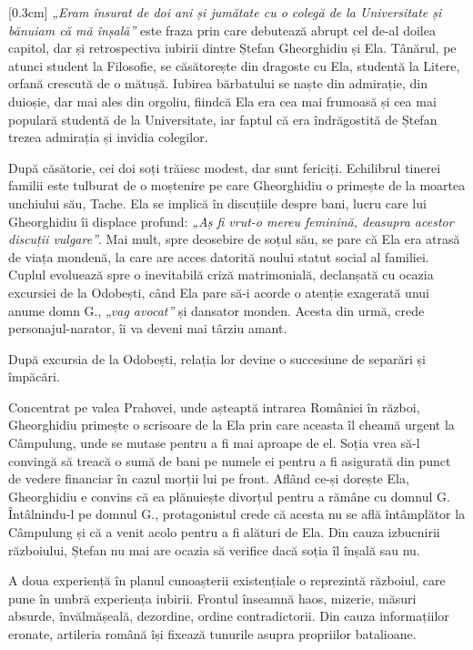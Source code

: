 [0.3cm]
\textit{„Eram însurat de doi ani și jumătate cu o colegă de la Universitate și bănuiam că mă înșală”} este fraza prin care debutează abrupt cel de-al doilea capitol, dar și retrospectiva iubirii dintre Ștefan Gheorghidiu și Ela. Tânărul, pe atunci student la Filosofie, se căsătorește din dragoste cu Ela, studentă la Litere, orfană crescută de o mătușă. Iubirea bărbatului se naște din admirație, din duioșie, dar mai ales din orgoliu, fiindcă Ela era cea mai frumoasă și cea mai populară studentă de la Universitate, iar faptul că era îndrăgostită de Ștefan trezea admirația și invidia colegilor.

După căsătorie, cei doi soți trăiesc modest, dar sunt fericiți. Echilibrul tinerei familii este tulburat de o moștenire pe care Gheorghidiu o primește de la moartea unchiului său, Tache. Ela se implică în discuțiile despre bani, lucru care lui Gheorghidiu îi displace profund: \textit{„Aș fi vrut-o mereu feminină, deasupra acestor discuții vulgare”}. Mai mult, spre deosebire de soțul său, se pare că Ela era atrasă de viața mondenă, la care are acces datorită noului statut social al familiei. Cuplul evoluează spre o inevitabilă criză matrimonială, declanșată cu ocazia excursiei de la Odobești, când Ela pare să-i acorde o atenție exagerată unui anume domn G., \textit{„vag avocat”} și dansator monden. Acesta din urmă, crede personajul-narator, îi va deveni mai târziu amant.

După excursia de la Odobești, relația lor devine o succesiune de separări și împăcări.

\clearpage

Concentrat pe valea Prahovei, unde așteaptă intrarea României în război, Gheorghidiu primește o scrisoare de la Ela prin care aceasta îl cheamă urgent la Câmpulung, unde se mutase pentru a fi mai aproape de el. Soția vrea să-l convingă să treacă o sumă de bani pe numele ei pentru a fi asigurată din punct de vedere financiar în cazul morții lui pe front. Aflând ce-și dorește Ela, Gheorghidiu e convins că ea plănuiește divorțul pentru a rămâne cu domnul G. Întâlnindu-l pe domnul G., protagonistul crede că acesta nu se află întâmplător la Câmpulung și că a venit acolo pentru a fi alături de Ela. Din cauza izbucnirii războiului, Ștefan nu mai are ocazia să verifice dacă soția îl înșală sau nu.

A doua experiență în planul cunoașterii existențiale o reprezintă războiul, care pune în umbră experiența iubirii. Frontul înseamnă haos, mizerie, măsuri absurde, învălmășeală, dezordine, ordine contradictorii. Din cauza informațiilor eronate, artileria română își fixează tunurile asupra propriilor batalioane.

